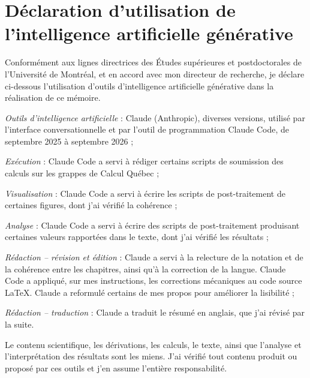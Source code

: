 \chapter{Déclaration d'utilisation de l'intelligence artificielle générative}
\label{chap:annexe-ia}

Conformément aux lignes directrices des Études supérieures et postdoctorales de l'Université de Montréal, et en accord avec mon directeur de recherche, je déclare ci-dessous l'utilisation d'outils d'intelligence artificielle générative dans la réalisation de ce mémoire.

\bigskip 

\textit{Outils d'intelligence artificielle} : Claude (Anthropic), diverses versions, utilisé par l'interface conversationnelle et par l'outil de programmation Claude Code, de septembre 2025 à septembre 2026 ;

\textit{Exécution} : Claude Code a servi à rédiger certains scripts de soumission des calculs sur les grappes de Calcul Québec ;

\textit{Visualisation} : Claude Code a servi à écrire les scripts de post-traitement de certaines figures, dont j'ai vérifié la cohérence ;

\textit{Analyse} : Claude Code a servi à écrire des scripts de post-traitement produisant certaines valeurs rapportées dans le texte, dont j'ai vérifié les résultats ;

\textit{Rédaction -- révision et édition} : Claude a servi à la relecture de la notation et de la cohérence entre les chapitres, ainsi qu'à la correction de la langue. Claude Code a appliqué, sur mes instructions, les corrections mécaniques au code source \LaTeX{}. Claude a reformulé certains de mes propos pour améliorer la lisibilité ;

\textit{Rédaction -- traduction} : Claude a traduit le résumé en anglais, que j'ai révisé par la suite.

\bigskip

Le contenu scientifique, les dérivations, les calculs, le texte, ainsi que l'analyse et l'interprétation des résultats sont les miens. J'ai vérifié tout contenu produit ou proposé par ces outils et j'en assume l'entière responsabilité.